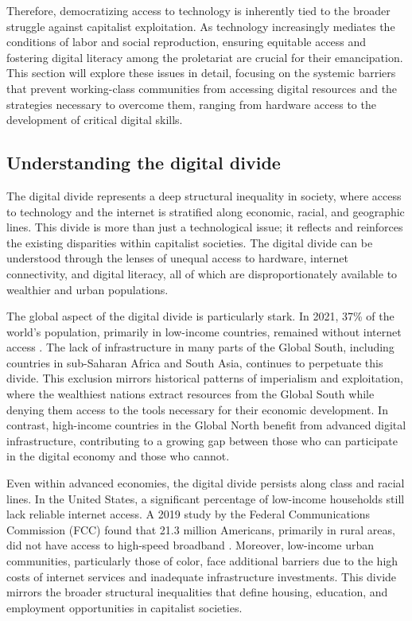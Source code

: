 \begin{refsection}
Therefore, democratizing access to technology is inherently tied to the broader struggle against capitalist exploitation. As technology increasingly mediates the conditions of labor and social reproduction, ensuring equitable access and fostering digital literacy among the proletariat are crucial for their emancipation. This section will explore these issues in detail, focusing on the systemic barriers that prevent working-class communities from accessing digital resources and the strategies necessary to overcome them, ranging from hardware access to the development of critical digital skills.

\subsection{Understanding the digital divide}

The digital divide represents a deep structural inequality in society, where access to technology and the internet is stratified along economic, racial, and geographic lines. This divide is more than just a technological issue; it reflects and reinforces the existing disparities within capitalist societies. The digital divide can be understood through the lenses of unequal access to hardware, internet connectivity, and digital literacy, all of which are disproportionately available to wealthier and urban populations.

The global aspect of the digital divide is particularly stark. In 2021, 37\% of the world's population, primarily in low-income countries, remained without internet access \cite[pp.~45-47]{fuchsrole}. The lack of infrastructure in many parts of the Global South, including countries in sub-Saharan Africa and South Asia, continues to perpetuate this divide. This exclusion mirrors historical patterns of imperialism and exploitation, where the wealthiest nations extract resources from the Global South while denying them access to the tools necessary for their economic development. In contrast, high-income countries in the Global North benefit from advanced digital infrastructure, contributing to a growing gap between those who can participate in the digital economy and those who cannot.

Even within advanced economies, the digital divide persists along class and racial lines. In the United States, a significant percentage of low-income households still lack reliable internet access. A 2019 study by the Federal Communications Commission (FCC) found that 21.3 million Americans, primarily in rural areas, did not have access to high-speed broadband \cite[pp.~102-105]{pickdigitaldivide}. Moreover, low-income urban communities, particularly those of color, face additional barriers due to the high costs of internet services and inadequate infrastructure investments. This divide mirrors the broader structural inequalities that define housing, education, and employment opportunities in capitalist societies.


\end{refsection}
